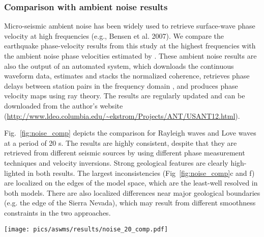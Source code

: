 
\subsubsection{Comparison with ambient noise results}
\label{sec:noise_comp}

Micro-seismic ambient noise has been widely used to retrieve surface-wave phase velocity at high frequencies (e.g., Bensen et al. 2007). We compare the earthquake phase-velocity results from this study at the highest frequencies with the ambient noise phase velocities estimated by \citet{Ekstrom:2013dr}. These ambient noise results are also the output of an automated system, which downloads the continuous waveform data, estimates and stacks the normalized coherence, retrieves phase delays between station pairs in the frequency domain \citep{Ekstrom:2009iv}, and produces phase velocity maps using ray theory. The results are regularly updated and can be downloaded from the author's website (\url{http://www.ldeo.columbia.edu/~ekstrom/Projects/ANT/USANT12.html}).

Fig.~\ref{fig:noise_comp} depicts the comparison for Rayleigh waves and Love waves at a period of 20 s. The results are highly consistent, despite that they are retrieved from different seismic sources by using different phase measurement techniques and velocity inversions. Strong geological features are clearly high-lighted in both results. The largest inconsistencies (Fig~\ref{fig:noise_comp}c and f) are localized on the edges of the model space, which are the least-well resolved in both models.  There are also localized differences near major geological boundaries (e.g. the edge of the Sierra Nevada), which may result from different smoothness constraints in the two approaches.

\begin{figure*}
	\center
	\texttt{[image: pics/aswms/results/noise\_20\_comp.pdf]}
	\caption{20-s Rayleigh and Love wave phase-velocity comparison between the earthquake results (this study) and the ambient noise  results (Ekstr\"om 2013). \textbf{a)} The earthquake result. \textbf{b)} The ambient noise result. \textbf{c)} The subtraction of b) from a). \textbf{d)-f)}: Same as a)-c), but for Love waves.}
	\label{fig:noise_comp}
\end{figure*}

